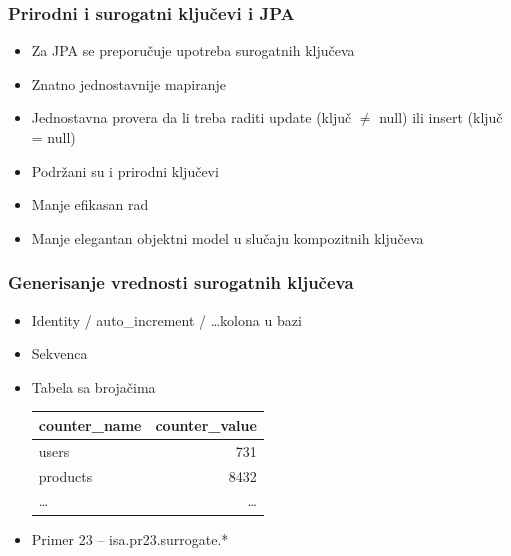 \documentclass[compress]{beamer}
\begin{document}
\begin{frame}
  \frametitle{Prirodni i surogatni ključevi i JPA}
  \begin{itemize}
    \item Za JPA se preporučuje upotreba surogatnih ključeva
    \item Znatno jednostavnije mapiranje
    \item Jednostavna provera da li treba raditi update (ključ $\neq$ null) ili insert (ključ = null)
  \end{itemize}

  \begin{itemize}
    \item Podržani su i prirodni ključevi
    \item Manje efikasan rad
    \item Manje elegantan objektni model u slučaju kompozitnih ključeva
  \end{itemize}
\end{frame}
\begin{frame}
  \frametitle{Generisanje vrednosti surogatnih ključeva}
  \begin{itemize}
    \item Identity / auto\_increment / \ldots kolona u bazi
    \item Sekvenca
    \item Tabela sa brojačima \\
    \small{\begin{tabular}{l|r}
      \textbf{counter\_name} & \textbf{counter\_value} \\ \hline
      users & 731 \\ 
      products & 8432 \\
      \ldots & \ldots
    \end{tabular}}
  \end{itemize}

  \begin{itemize}
    \item Primer 23 -- isa.pr23.surrogate.*
  \end{itemize}
\end{frame}
\end{document}
